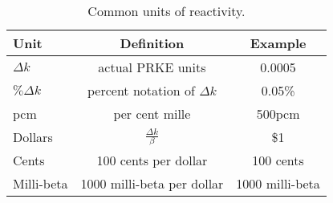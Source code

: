     \begin{table}[h!]
    \centering
      \begin{tabular}{|l|c|c||}
        \hline
        Unit & Definition & Example\\
        \hline
        $\Delta k$ & actual PRKE units & 0.0005 \\
        $\%\Delta k$ & percent notation of $\Delta k$ & 0.05\% \\
        pcm & per cent mille & 500pcm \\
        \hline
        Dollars & $\frac{\Delta k}{\beta}$ & \$1\\
        Cents & 100 cents per dollar & 100 cents\\
        Milli-beta & 1000 milli-beta per dollar& 1000 milli-beta\\
        \hline
      \end{tabular}
      \caption{Common units of reactivity.}
      \label{tab:rho_units}
    \end{table}
